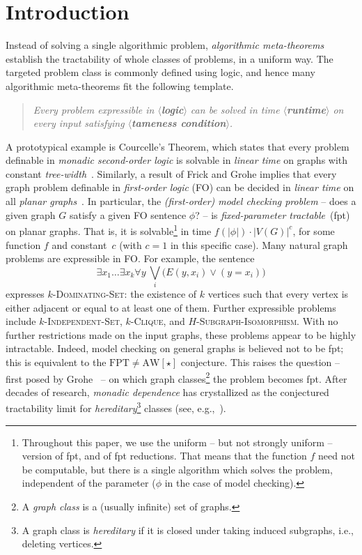 \newpage
\section{Introduction}
\newcommand{\AWstar}{$\mathrm{AW}[\star]$}

Instead of solving a single algorithmic problem, \emph{algorithmic meta-theorems}
establish the tractability of whole classes of problems, in a uniform way.
The targeted problem class is commonly defined using logic, and hence many algorithmic meta-theorems fit the following template.

\newcommand{\placeholder}[1]{\textup{\textbf{$\boldsymbol{\langle}$#1$\boldsymbol{\rangle}$}}}
\begin{quote}
\emph{Every problem expressible in \placeholder{logic} can be solved in time \placeholder{runtime} on every input satisfying \placeholder{tameness condition}.}
\end{quote}
A prototypical example is Courcelle's Theorem, which states that every problem definable in \emph{monadic second-order logic} is solvable in \emph{linear time} on graphs with constant \emph{tree-width}~\cite{courcelle1990monadic}.
Similarly, a result of Frick and Grohe
implies that every graph problem definable in \emph{first-order logic} (FO) can be decided in \emph{linear time} on all \emph{planar graphs}~\cite{frick2001deciding}.
In particular, the \emph{(first-order) model checking problem}
-- does a given graph $G$ satisfy a given FO sentence $\phi$?  -- is \emph{fixed-parameter tractable}~(fpt) on planar graphs.
That is, it is solvable\footnote{Throughout this paper, we use the uniform -- but not strongly uniform -- version of fpt, and of fpt reductions. That means that the function $f$ need not be computable, but there is a single algorithm which solves the problem, independent of the parameter ($\phi$ in the case of model checking).} in time $f(|\phi|)\cdot |V(G)|^c$, for some function $f$ and constant~$c$ (with $c=1$ in this specific case).
Many natural graph problems are expressible in FO.
For example, the sentence
\[
    \exists x_1 \ldots \exists x_k  \forall y\
    \bigvee_i\big(E(y,x_i) \vee (y = x_i)\big)
\]
expresses $k$-\textsc{Dominating-Set}: the existence of $k$ vertices  such that every vertex is either adjacent or equal to at least one of them.
Further expressible problems include $k$-\textsc{Independent-Set}, $k$-\textsc{Clique}, and $H$-\textsc{Subgraph-Isomorphism}.
With no further restrictions made on the input graphs,
these problems appear to be highly intractable.
Indeed, model checking on general graphs is believed not to be fpt; this is equivalent to the $\mathrm{FPT}{\neq}\mathrm{AW}[\star]$ conjecture.
This raises the question -- first posed by Grohe~\cite[Section~8.2]{logic-graphs-algorithms} -- on which graph classes\footnote{A \emph{graph class} is a (usually infinite) set of graphs.}
the problem becomes fpt.
After decades of research, \emph{monadic dependence} has crystallized as the conjectured tractability limit for \emph{hereditary}\footnote{A graph class is \emph{hereditary} if it is closed under taking induced subgraphs, i.e., deleting vertices.} classes (see, e.g.,~\cite{warwick-problems,new-perspective-journal,tww4,ms-mc1}).

